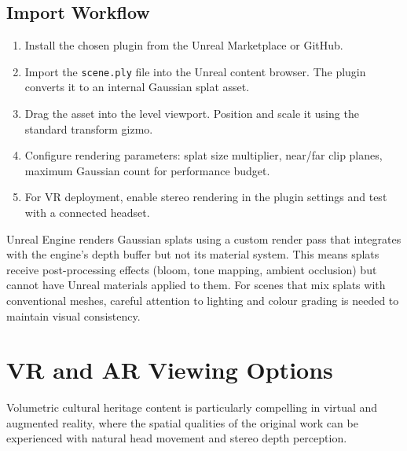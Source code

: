 \subsection{Import Workflow}

\begin{enumerate}
  \item Install the chosen plugin from the Unreal Marketplace or GitHub.
  \item Import the \texttt{scene.ply} file into the Unreal content browser. The plugin converts it to an internal Gaussian splat asset.
  \item Drag the asset into the level viewport. Position and scale it using the standard transform gizmo.
  \item Configure rendering parameters: splat size multiplier, near/far clip planes, maximum Gaussian count for performance budget.
  \item For VR deployment, enable stereo rendering in the plugin settings and test with a connected headset.
\end{enumerate}

\begin{technote}
Unreal Engine renders Gaussian splats using a custom render pass that integrates with the engine's depth buffer but not its material system. This means splats receive post-processing effects (bloom, tone mapping, ambient occlusion) but cannot have Unreal materials applied to them. For scenes that mix splats with conventional meshes, careful attention to lighting and colour grading is needed to maintain visual consistency.
\end{technote}

\section{VR and AR Viewing Options}
\label{sec:view-xr}

Volumetric cultural heritage content is particularly compelling in virtual and augmented reality, where the spatial qualities of the original work can be experienced with natural head movement and stereo depth perception.


